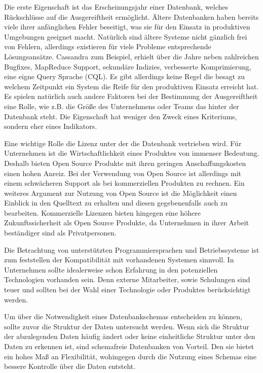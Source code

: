 Die erste Eigenschaft ist das Erscheinungsjahr einer Datenbank, welches Rückschlüsse auf die Ausgereiftheit ermöglicht. Ältere Datenbanken haben bereits viele ihrer anfänglichen Fehler beseitigt, was sie für den Einsatz in produktiven Umgebungen geeignet macht. Natürlich sind ältere Systeme nicht gänzlich frei von Fehlern, allerdings existieren für viele Probleme entsprechende Lösungsansätze. Cassandra zum Beispiel, erhielt über die Jahre neben zahlreichen Bugfixes, MapReduce Support, sekundäre Indizies, verbesserte Komprimierung, eine eigne Query Sprache (CQL). Es gibt allerdings keine Regel die besagt zu welchem Zeitpunkt ein System die Reife für den produktiven Einsatz erreicht hat. Es spielen natürlich auch andere Faktoren bei der Bestimmung der Ausgereiftheit eine Rolle, wie z.B. die Größe des Unternehmens oder Teams das hinter der Datenbank steht. Die Eigenschaft hat weniger den Zweck eines Kriteriums, sondern eher eines Indikators. 

Eine wichtige Rolle die Lizenz unter der die Datenbank vertrieben wird. Für Unternehmen ist die Wirtschaftlichkeit eines Produktes von immenser Bedeutung. Deshalb bieten Open Source Produkte mit ihren geringen Anschaffungskosten einen hohen Anreiz. Bei der Verwendung von Open Source ist allerdings mit einem schwächeren Support als bei kommerziellen Produkten zu rechnen. Ein weiteres Argument zur Nutzung von Open Source ist die Möglichkeit einen Einblick in den Quelltext zu erhalten und diesen gegebenenfalls auch zu bearbeiten. Kommerzielle Lizenzen bieten hingegen eine höhere Zukunftssicherheit als Open Source Produkte, da Unternehmen in ihrer Arbeit beständiger sind als Privatpersonen.

Die Betrachtung von unterstützten Programmiersprachen und Betriebssysteme ist zum feststellen der Kompatibilität mit vorhandenen Systemen sinnvoll. In Unternehmen sollte idealerweise schon Erfahrung in den potenziellen Technologien vorhanden sein. Denn externe Mitarbeiter, sowie Schulungen sind teuer und sollten bei der Wahl einer Technologie oder Produktes berücksichtigt werden. 

Um über die Notwendigkeit eines Datenbankschemas entscheiden zu können, sollte zuvor die Struktur der Daten untersucht werden. Wenn sich die Struktur der abzulegenden Daten häufig ändert oder keine einheitliche Struktur unter den Daten zu erkennen ist, sind schemafreie Datenbanken von Vorteil. Den sie bietet ein hohes Maß an Flexibilität, wohingegen durch die Nutzung eines Schemas eine bessere Kontrolle über die Daten entsteht.  


